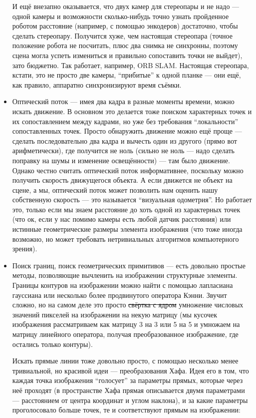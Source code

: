 \documentclass{../../text-style}
\begin{document}
\begin{itemize}
        И ещё внезапно оказывается, что двух камер для стереопары и не надо --- одной камеры и возможности сколько-нибудь точно узнать пройденное роботом расстояние (например, с помощью энкодеров) достаточно, чтобы сделать стереопару.
        Получится хуже, чем настоящая стереопара (точное положение робота не посчитать, плюс два снимка не синхронны, поэтому сцена могла успеть измениться и правильно сопоставить точки не выйдет), зато бюджетно.
        Так работает, например, ORB SLAM.
        Настоящая стереопара, кстати, это не просто две камеры, \enquote{прибитые} к одной планке --- они ещё, как правило, аппаратно синхронизируют время съёмки. 
    \item Оптический поток --- имея два кадра в разные моменты времени, можно искать движение.
        В основном это делается тоже поиском характерных точек и их сопоставлением между кадрами, но уже без требования \enquote{локальности} сопоставленных точек.
        Просто обнаружить движение можно ещё проще --- сделать последовательно два кадра и вычесть один из другого (прямо вот арифметически), где получится не ноль (сильно не ноль --- надо сделать поправку на шумы и изменение освещённости) --- там было движение.
        Однако честно считать оптический поток информативнее, поскольку можно получить скорость движущегося объекта.
        А если движется не объект на сцене, а мы, оптический поток может позволить нам оценить нашу собственную скорость --- это называется \enquote{визуальная одометрия}.
        Но работает это, только если мы знаем расстояние до хоть одной из характерных точек (что ок, если у нас помимо камеры есть любой датчик расстояния) или истинные геометрические размеры элемента изображения (что тоже иногда возможно, но может требовать нетривиальных алгоритмов компьютерного зрения).
    \item Поиск границ, поиск геометрических примитивов --- есть довольно простые методы, позволяющие вычленить на изображении структурные элементы.
        Границы контуров на изображении можно найти с помощью лапласиана гауссиана или несколько более продвинутого оператора Кэнни.
        Звучит сложно, но на самом деле это просто \sout{свёртка с ядром} умножение числовых значений пикселей на изображении на некую матрицу (мы кусочек изображения рассматриваем как матрицу 3 на 3 или 5 на 5 и умножаем на матрицу линейного оператора, получая преобразованное изображение, где остались только контуры).
        
        Искать прямые линии тоже довольно просто, с помощью несколько менее тривиальной, но красивой идеи --- преобразования Хафа.
        Идея его в том, что каждая точка изображения \enquote{голосует} за параметры прямых, которые через неё проходят (в пространстве Хафа прямая описывается двумя параметрами --- расстоянием от центра координат и углом наклона), и за какие параметры проголосовало больше точек, те и соответствуют прямым на изображении:


\end{itemize}
\end{document}
